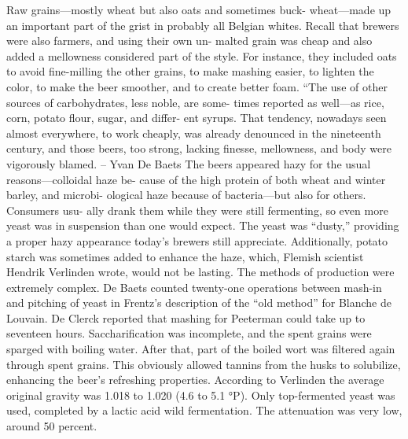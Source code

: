 \documentclass[a4paper,parskip=half]{scrartcl}
\begin{document}
\parencite[39]{Hieronymus2010}

Raw grains—mostly wheat but also oats and sometimes buck-
wheat—made up an important part of the grist in probably all Belgian
whites. Recall that brewers were also farmers, and using their own un-
malted grain was cheap and also added a mellowness considered part of
the style. For instance, they included oats to avoid fine-milling the other
grains, to make mashing easier, to lighten the color, to make the beer
smoother, and to create better foam.
“The use of other sources of carbohydrates, less noble, are some-
times reported as well—as rice, corn, potato ﬂour, sugar, and differ-
ent syrups. That tendency, nowadays seen almost everywhere, to work
cheaply, was already denounced in the nineteenth century, and those
beers, too strong, lacking finesse, mellowness, and body were vigorously
blamed.
– Yvan De Baets
The beers appeared hazy for the usual reasons—colloidal haze be-
cause of the high protein of both wheat and winter barley, and microbi-
ological haze because of bacteria—but also for others. Consumers usu-
ally drank them while they were still fermenting, so even more yeast was
in suspension than one would expect. The yeast was “dusty,” providing
a proper hazy appearance today’s brewers still appreciate. Additionally,
potato starch was sometimes added to enhance the haze, which, Flemish
scientist Hendrik Verlinden wrote, would not be lasting.
The methods of production were extremely complex. De Baets
counted twenty-one operations between mash-in and pitching of
yeast in Frentz’s description of the “old method” for Blanche de
Louvain. De Clerck reported that mashing for Peeterman could take
up to seventeen hours. Saccharification was incomplete, and the
spent grains were sparged with boiling water. After that, part of the
boiled wort was filtered again through spent grains. This obviously
allowed tannins from the husks to solubilize, enhancing the beer’s
refreshing properties.
According to Verlinden the average original gravity was 1.018 to
1.020 (4.6 to 5.1 °P). Only top-fermented yeast was used, completed by
a lactic acid wild fermentation. The attenuation was very low, around
50 percent.

\parencite[40]{Hieronymus2010}
\end{document}
